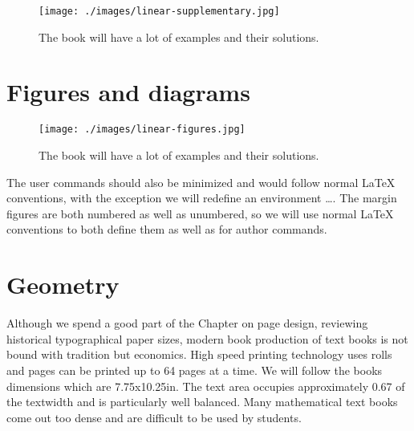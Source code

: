 \begin{figure}[htbp]
\texttt{[image: ./images/linear-supplementary.jpg]}
\caption{The book will have a lot of examples and their solutions. }
\end{figure}

\section{Figures and diagrams}

\begin{figure}[htbp]
\texttt{[image: ./images/linear-figures.jpg]}
\caption{The book will have a lot of examples and their solutions. }
\end{figure}

The user commands should also be minimized and would follow normal LaTeX conventions, with the exception we will redefine an environment \cmd{\begin}\ldots. The margin figures are both numbered as well as unumbered, so we will use normal LaTeX conventions to both define them as well as for author commands. 



\section{Geometry}

Although we spend a good part of the Chapter on page design, reviewing historical typographical paper sizes, modern book production of text books is not bound with tradition but economics. High speed printing technology uses rolls and pages can be printed up to 64 pages at a time. We will follow the books dimensions which are 7.75x10.25in. The text area occupies approximately 0.67 of the textwidth and is particularly well balanced. Many mathematical text books come out too dense and are difficult to be used by students. 






